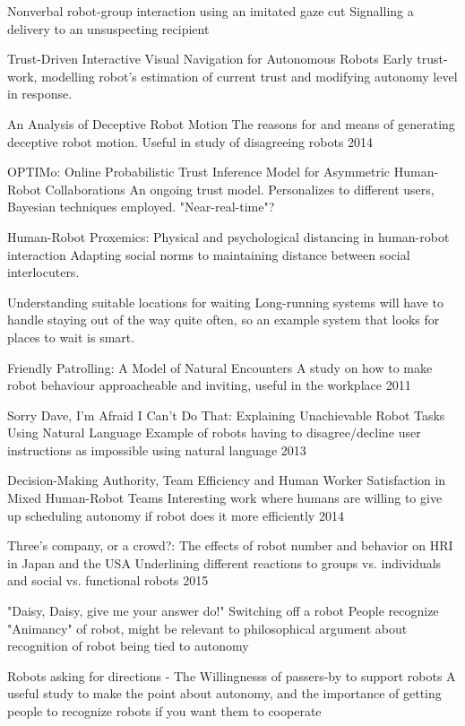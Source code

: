 \documentclass{sfuthesis}
\begin{document}
Nonverbal robot-group interaction using an imitated gaze cut	Signalling a delivery to an unsuspecting recipient	

Trust-Driven Interactive Visual Navigation for Autonomous Robots	Early trust-work, modelling robot's estimation of current trust and modifying autonomy level in response.	

An Analysis of Deceptive Robot Motion	The reasons for and means of generating deceptive robot motion. Useful in study of disagreeing robots	2014

OPTIMo: Online Probabilistic Trust Inference Model for Asymmetric Human-Robot Collaborations	An ongoing trust model. Personalizes to different users, Bayesian techniques employed. "Near-real-time"?	

Human-Robot Proxemics: Physical and psychological distancing in human-robot interaction	Adapting social norms to maintaining distance between social interlocuters.	

Understanding suitable locations for waiting	Long-running systems will have to handle staying out of the way quite often, so an example system that looks for places to wait is smart.	

Friendly Patrolling: A Model of Natural Encounters	A study on how to make robot behaviour approacheable and inviting, useful in the workplace	2011

Sorry Dave, I'm Afraid I Can't Do That: Explaining Unachievable Robot Tasks Using Natural Language	Example of robots having to disagree/decline user instructions as impossible using natural language	2013

Decision-Making Authority, Team Efficiency and Human Worker Satisfaction in Mixed Human-Robot Teams	Interesting work where humans are willing to give up scheduling autonomy if robot does it more efficiently	2014

Three's company, or a crowd?: The effects of robot number and behavior on HRI in Japan and the USA	Underlining different reactions to groups vs. individuals and social vs. functional robots	2015

"Daisy, Daisy, give me your answer do!" Switching off a robot	People recognize "Animancy" of robot, might be relevant to philosophical argument about recognition of robot being tied to autonomy	

Robots asking for directions - The Willingnesss of passers-by to support robots	A useful study to make the point about autonomy, and the importance of getting people to recognize robots if you want them to cooperate	
\end{document}
